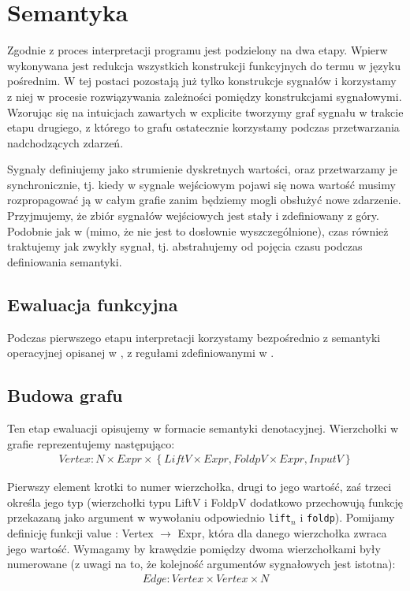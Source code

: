 \documentclass[11pt,leqno]{article}
\begin{document}
\section{Semantyka}

Zgodnie z \cite[p.~3.3]{CC} proces interpretacji programu jest podzielony na dwa etapy. Wpierw wykonywana jest redukcja wszystkich konstrukcji funkcyjnych do termu w języku pośrednim. W tej postaci  pozostają już tylko konstrukcje sygnałów i korzystamy z niej w procesie rozwiązywania zależności pomiędzy konstrukcjami sygnałowymi. Wzorując się na intuicjach zawartych w \cite[p.~3.3.2]{CC} explicite tworzymy graf sygnału w trakcie etapu drugiego, z którego to grafu ostatecznie korzystamy podczas przetwarzania nadchodzących zdarzeń.


Sygnały definiujemy jako strumienie dyskretnych wartości, oraz przetwarzamy je synchronicznie, tj. kiedy w sygnale wejściowym pojawi się nowa wartość musimy rozpropagować ją w całym grafie zanim będziemy mogli obsłużyć nowe zdarzenie. Przyjmujemy, że zbiór sygnałów wejściowych jest stały i zdefiniowany z góry. Podobnie jak w \nocite{CC} (mimo, że nie jest to dosłownie wyszczególnione), czas również traktujemy jak zwykły sygnał, tj. abstrahujemy od pojęcia czasu podczas definiowania semantyki.

\subsection{Ewaluacja funkcyjna}

Podczas pierwszego etapu interpretacji korzystamy bezpośrednio z semantyki operacyjnej opisanej w \cite[p.~3.3.1]{CC}, z regułami zdefiniowanymi w \cite[fig.~6]{CC}. 

\subsection{Budowa grafu}
Ten etap ewaluacji opisujemy w formacie semantyki denotacyjnej. Wierzchołki w grafie reprezentujemy następująco:
\begin{gather*}
Vertex : N \times Expr \times \left\{ {LiftV \times Expr, FoldpV \times Expr, InputV}\right\} 
\end{gather*}

Pierwszy element krotki to numer wierzchołka, drugi to jego wartość, zaś trzeci określa jego typ (wierzchołki typu LiftV i FoldpV dodatkowo przechowują funkcję przekazaną jako argument w wywołaniu odpowiednio \texttt{lift$_{n}$} i \texttt{foldp}). Pomijamy definicję funkcji value : Vertex $\rightarrow$ Expr, która dla danego wierzchołka zwraca jego wartość. Wymagamy by krawędzie pomiędzy dwoma wierzchołkami były numerowane (z uwagi na to, że kolejność argumentów sygnałowych jest istotna):
\begin{gather*}
Edge : Vertex \times Vertex \times N
\end{gather*}
\end{document}
